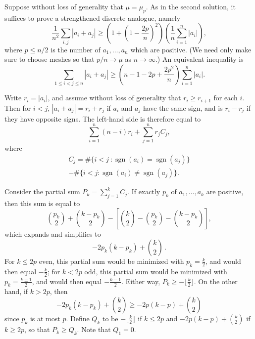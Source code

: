 \documentclass[amssymb,twocolumn,pra,10pt,aps]{revtex4-1}
\DeclareMathOperator{\sgn}{sgn}
\begin{document}
\begin{itemize}
Suppose without loss of generality that $\mu = \mu_p$.  As in the second
solution, it suffices to prove a
strengthened discrete analogue, namely
\[
\frac{1}{n^2} \sum_{i,j} |a_i + a_j| \ge
    \left(1 + \left(1 - \frac{2p}{n}\right)^2\right)\left(\frac{1}{n}
    \sum_{i=1}^{n} |a_i| \right),
\]
where $p \le n/2$ is the number of $a_1,\ldots,a_n$ which are positive.
(We need only make sure to choose meshes so that $p/n \to \mu$ as
$n \to \infty$.)
An equivalent inequality is
\[
\sum_{1 \le i < j \le n} | a_i + a_j | \ge \left(n - 1 - 2p +
    \frac{2p^2}{n}\right) \sum_{i=1}^{n} | a_i |.
\]

Write $r_i = |a_i|$, and assume without loss of generality that $r_i \ge
r_{i+1}$ for each $i$. Then for $i<j$,
$|a_i + a_j| = r_i + r_j$ if $a_i$ and $a_j$
have the same sign, and is $r_i - r_j$ if they have opposite signs. The
left-hand side is therefore equal to
\[
\sum_{i = 1}^n (n - i) r_i + \sum_{j = 1}^n r_j C_j,
\]
where
\begin{multline*}
C_j = \#\{ i < j \ : \sgn(a_i) = \sgn(a_j)\} \\
- \#\{ i < j : \sgn(a_i) \neq \sgn(a_j)\}.
\end{multline*}

Consider the partial sum $P_k = \sum_{j = 1}^{k} C_j$.  If exactly $p_k$ of
$a_1,\ldots,a_k$ are positive, then this sum is equal to
\[
\binom{p_k}{2} + \binom{k-p_k}{2} - \left[ \binom {k}{2} -
\binom{p_k}{2} - \binom{k-p_k}{2} \right],
\]
which expands and simplifies to
\[
-2 p_k (k-p_k) + \binom{k}{2} \,.
\]
For $k \le 2p$ even, this partial sum would be minimized with $p_k = \frac{k}{2}$,
and would then equal $-\frac{k}{2}$; for $k < 2p$ odd, this partial sum would
be minimized with $p_k = \frac{k \pm 1}{2}$, and would then equal
$-\frac{k-1}{2}$.  Either way, $P_k \ge - \lfloor \frac{k}{2} \rfloor$.  On the other
hand, if $k > 2p$, then
\[
-2 p_k (k-p_k) + \binom{k}{2} \ge -2 p(k-p) + \binom{k}{2}
\]
since $p_k$ is at most $p$. Define $Q_k$ to
be $- \lfloor \frac{k}{2} \rfloor$ if $k \le
2p$ and $-2 p(k-p) + \binom{k}{2}$ if $k \ge 2p$, so that $P_k \ge Q_k$.  Note
that $Q_1=0$.


\end{itemize}
\end{document}
